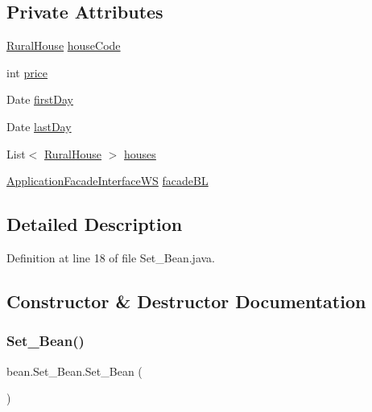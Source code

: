 \subsection*{Private Attributes}
\begin{DoxyCompactItemize}
\item 
\mbox{\hyperlink{classdomain_1_1RuralHouse}{Rural\+House}} \mbox{\hyperlink{classbean_1_1Set__Bean_a80c8bf1baec6aa3305f06e8f34c4905d}{house\+Code}}
\item 
int \mbox{\hyperlink{classbean_1_1Set__Bean_a667afccf27f2b9861fecfb2f23bf9041}{price}}
\item 
Date \mbox{\hyperlink{classbean_1_1Set__Bean_a5f403451f5e63a57aa62d0ea72fb020b}{first\+Day}}
\item 
Date \mbox{\hyperlink{classbean_1_1Set__Bean_ab7eaecf178a4ca10c791779a0bf72954}{last\+Day}}
\item 
List$<$ \mbox{\hyperlink{classdomain_1_1RuralHouse}{Rural\+House}} $>$ \mbox{\hyperlink{classbean_1_1Set__Bean_af99beccb4531fab9e9e96b5277ea4b6c}{houses}}
\item 
\mbox{\hyperlink{interfacebusinessLogic_1_1ApplicationFacadeInterfaceWS}{Application\+Facade\+Interface\+WS}} \mbox{\hyperlink{classbean_1_1Set__Bean_afdf90e7df10b28094116c50ee84df11d}{facade\+BL}}
\end{DoxyCompactItemize}


\subsection{Detailed Description}


Definition at line 18 of file Set\+\_\+\+Bean.\+java.



\subsection{Constructor \& Destructor Documentation}
\mbox{\label{classbean_1_1Set__Bean_ade7defe328857d39eea0c4b4ca7b7645}} 
\subsubsection{\texorpdfstring{Set\_Bean()}{Set\_Bean()}}
{\footnotesize\ttfamily bean.\+Set\+\_\+\+Bean.\+Set\+\_\+\+Bean (\begin{DoxyParamCaption}{ }\end{DoxyParamCaption})}



